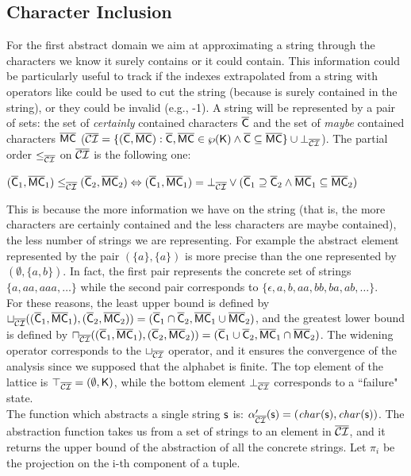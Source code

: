 \documentclass[orivec]{llncs}
\begin{document}
 
 
\subsection{Character Inclusion}
 
For the first abstract domain we aim at approximating a string through the characters we know it surely contains or it could contain. This information could be particularly useful to track if the indexes extrapolated from a string with operators like  could be used to cut the string (because  is surely contained in the string), or they could be invalid (e.g., -1).
A string will be represented by a pair of sets: the set of \textit{certainly} contained characters $\mathsf{\overline{C}}$ and the set of \textit{maybe} contained characters $\mathsf{\overline{MC}}$ ($\mathsf{\overline{\mathsf{\mathcal{CI}}}} = \{ (\mathsf{\overline{C}}, \mathsf{\overline{MC}}) : \mathsf{\overline{C}}, \mathsf{\overline{MC}} \in \wp(\mathsf{K}) \wedge \mathsf{\overline{C}} \subseteq \mathsf{\overline{MC}} \} \cup \bot_{\mathsf{\overline{\mathsf{\mathcal{CI}}}}}$). The partial order $\leq_{\mathsf{\overline{\mathsf{\mathcal{CI}}}}}$ on $\mathsf{\overline{\mathsf{\mathcal{CI}}}}$ is the following one:
 
$(\mathsf{\overline{C}}_1, \mathsf{\overline{MC}}_1) \le_{\mathsf{\overline{\mathsf{\mathcal{CI}}}}} (\mathsf{\overline{C}}_2, \mathsf{\overline{MC}}_2) \Leftrightarrow (\mathsf{\overline{C}}_1, \mathsf{\overline{MC}}_1) = \bot_{\mathsf{\overline{\mathsf{\mathcal{CI}}}}} \lor (\mathsf{\overline{C}}_1 \supseteq \mathsf{\overline{C}}_2 \land \mathsf{\overline{MC}}_1 \subseteq \mathsf{\overline{MC}}_2)  $

\noindent This is because the more information we have on the string (that is, the more characters are certainly contained and the less characters are maybe contained), the less number of strings we are representing. For example the abstract element represented by the pair $(\{a\}, \{a\})$ is more precise than the one represented by $(\emptyset, \{a,b\})$. In fact, the first pair represents the concrete set of strings $\{a, aa, aaa, \dots\}$ while the second pair corresponds to $\{\epsilon, a, b, aa, bb, ba, ab, \dots\}$.\\
For these reasons, the least upper bound is defined by $\sqcup_{\mathsf{\overline{\mathsf{\mathcal{CI}}}}}((\mathsf{\overline{C}}_1,\mathsf{\overline{MC}}_1),(\mathsf{\overline{C}}_2,\mathsf{\overline{MC}}_2)) \allowbreak = (\mathsf{\overline{C}}_1 \cap \mathsf{\overline{C}}_2, \mathsf{\overline{MC}}_1 \cup \mathsf{\overline{MC}}_2)$, and the greatest lower bound is defined by $\sqcap_{\mathsf{\overline{\mathsf{\mathcal{CI}}}}}((\mathsf{\overline{C}}_1, \allowbreak \mathsf{\overline{MC}}_1),(\mathsf{\overline{C}}_2,\mathsf{\overline{MC}}_2)) = (\mathsf{\overline{C}}_1 \cup \mathsf{\overline{C}}_2, \mathsf{\overline{MC}}_1 \cap \mathsf{\overline{MC}}_2)$. The widening operator corresponds to the $\sqcup_{\mathsf{\overline{\mathsf{\mathcal{CI}}}}}$ operator, and it ensures the convergence of the analysis since we supposed that the alphabet is finite. The top element of the lattice is $\top_{\mathsf{\overline{\mathsf{\mathcal{CI}}}}}=(\emptyset,\mathsf{K})$, while the bottom element $\bot_{\mathsf{\overline{\mathsf{\mathcal{CI}}}}}$ corresponds to a ``failure" state. \\
The function which abstracts a single string $\mathsf{s}$ is: $\alpha_{\mathsf{\overline{\mathsf{\mathcal{CI}}}}}^\prime(\mathsf{s}) = ( \mathit{char}(\mathsf{s}), \mathit{char}(\mathsf{s}) )$. The abstraction function takes us from a set of strings to an element in $\mathsf{\overline{\mathsf{\mathcal{CI}}}}$, and it returns the upper bound of the abstraction of all the concrete strings. Let $\pi_i$ be the projection on the i-th component of a tuple.
 
\end{document}

